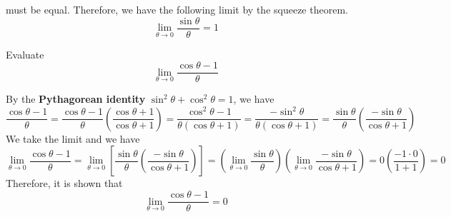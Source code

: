 must be equal.
Therefore, we have the following limit by the squeeze theorem.
\[\lim_{\theta\to 0}\frac{\sin\theta}{\theta}=1\]
\begin{problem}
    Evaluate \[\lim_{\theta\to 0}\frac{\cos\theta-1}{\theta}\]
\end{problem}
\begin{solution}
    By the \textbf{Pythagorean identity} \(\sin^2\theta+\cos^2\theta=1\), we have
    \[\frac{\cos\theta-1}{\theta}
    =\frac{\cos\theta-1}{\theta}\left(\frac{\cos\theta+1}{\cos\theta+1}\right)
    =\frac{\cos^2\theta-1}{\theta(\cos\theta+1)}
    =\frac{-\sin^2\theta}{\theta(\cos\theta+1)}
    =\frac{\sin\theta}{\theta}\left(\frac{-\sin\theta}{\cos\theta+1}\right)\]
    We take the limit and we have
    \[\lim_{\theta\to 0}\frac{\cos\theta-1}{\theta}
    =\lim_{\theta\to 0}\left[\frac{\sin\theta}{\theta}
    \left(\frac{-\sin\theta}{\cos\theta+1}\right)\right]
    =\left(\lim_{\theta\to 0}\frac{\sin\theta}{\theta}\right)
    \left(\lim_{\theta\to 0}\frac{-\sin\theta}{\cos\theta+1}\right)
    =0\left(\frac{-1\cdot0}{1+1}\right)=0\]
    Therefore, it is shown that
    \[\lim_{\theta\to 0}\frac{\cos\theta-1}{\theta}=0\]
\end{solution}